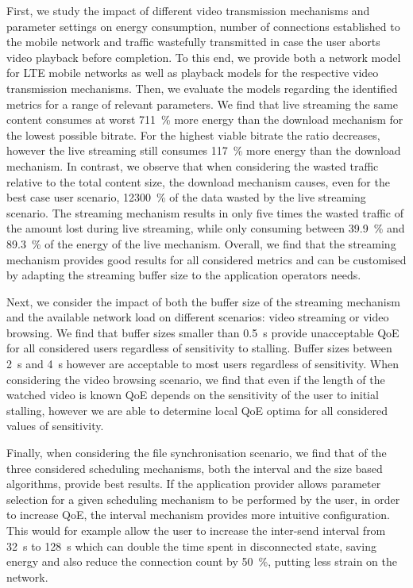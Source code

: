 First, we study the impact of different video transmission mechanisms and parameter settings on energy consumption, number of connections established to the mobile network and traffic wastefully transmitted in case the user aborts video playback before completion.
To this end, we provide both a network model for \gls{LTE} mobile networks as well as playback models for the respective video transmission mechanisms.
Then, we evaluate the models regarding the identified metrics for a range of relevant parameters.
We find that live streaming the same content consumes at worst \SI{711}{\percent} more energy than the download mechanism for the lowest possible bitrate. For the highest viable bitrate the ratio decreases, however the live streaming still consumes \SI{117}{\percent} more energy than the download mechanism.
In contrast, we observe that when considering the wasted traffic relative to the total content size, the download mechanism causes, even for the best case user scenario, \SI{12300}{\percent} of the data wasted by the live streaming scenario.
The streaming mechanism results in only five times the wasted traffic of the amount lost during live streaming, while only consuming between \SI{39.9}{\percent} and \SI{89.3}{\percent} of the energy of the live mechanism.	
Overall, we find that the streaming mechanism provides good results for all considered metrics and can be customised by adapting the streaming buffer size to the application operators needs. 

Next, we consider the impact of both the buffer size of the streaming mechanism and the available network load on different scenarios: video streaming or video browsing.
We find that buffer sizes smaller than \SI{0.5}{\second} provide unacceptable \gls{QoE} for all considered users regardless of sensitivity to stalling.
Buffer sizes between \SI{2}{\second} and \SI{4}{\second} however are acceptable to most users regardless of sensitivity.
When considering the video browsing scenario, we find that even if the length of the watched video is known \gls{QoE} depends on the sensitivity of the user to initial stalling, however we are able to determine local \gls{QoE} optima for all considered values of sensitivity.

Finally, when considering the file synchronisation scenario, we find that of the three considered scheduling mechanisms, both the interval and the size based algorithms, provide best results.
If the application provider allows parameter selection for a given scheduling mechanism to be performed by the user, in order to increase \gls{QoE}, the interval mechanism provides more intuitive configuration.
This would for example allow the user to increase the inter-send interval from \SI{32}{\second} to \SI{128}{\second} which can double the time spent in disconnected state, saving energy and also reduce the connection count by \SI{50}{\percent}, putting less strain on the network.


